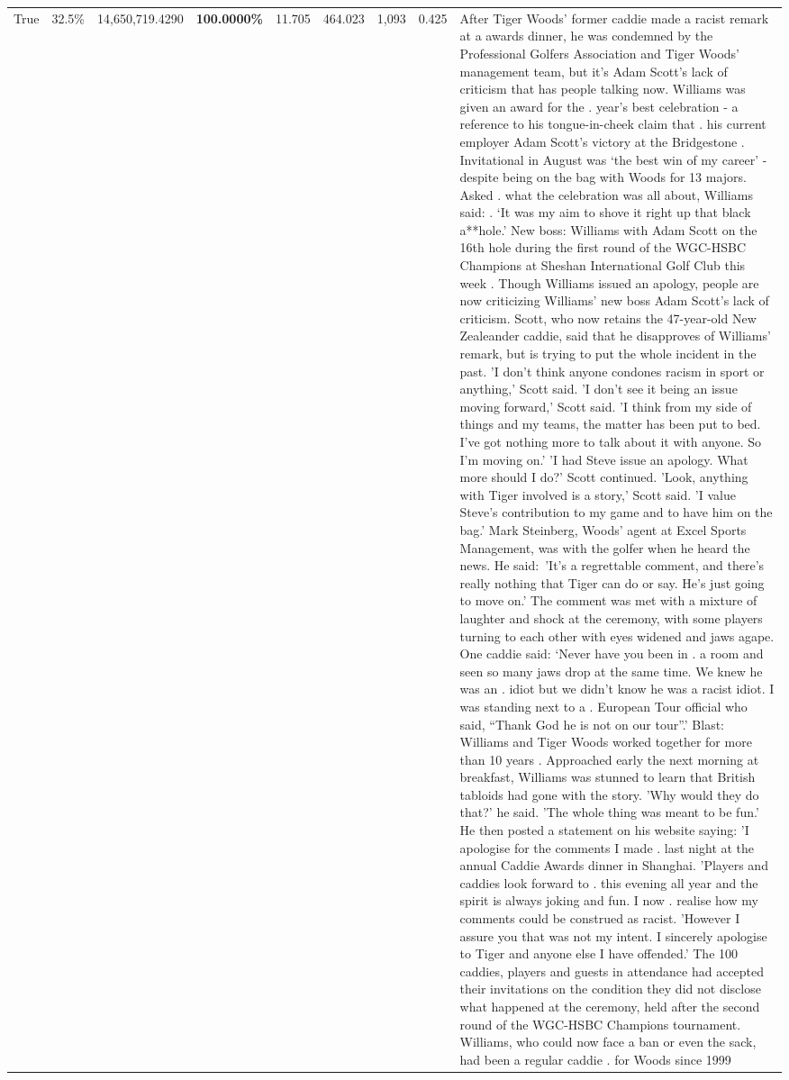 \begin{table}[H]
\begin{tabular}{lllrlllll}
True & 32.5\% & 14,650,719.4290 & \bfseries \color{red} 100.0000\% & 11.705 & 464.023 & 1,093 & 0.425 & After Tiger Woods' former caddie made a racist remark at a awards dinner, he was condemned by the Professional Golfers Association and Tiger Woods' management team, but it's Adam Scott's lack of criticism that has people talking now. Williams was given an award for the . year’s best celebration - a reference to his tongue-in-cheek claim that . his current employer Adam Scott’s victory at the Bridgestone . Invitational in August was ‘the best win of my career’ - despite being on the bag with Woods for 13 majors. Asked . what the celebration was all about, Williams said: . ‘It was my aim to shove it right up that black a**hole.’ New boss: Williams with Adam Scott  on the 16th hole during the first round of the WGC-HSBC Champions at Sheshan International Golf Club this week . Though Williams issued an apology, people are now criticizing Williams' new boss Adam Scott's lack of criticism. Scott, who now retains the 47-year-old New Zealeander caddie, said that he disapproves of Williams' remark, but is trying to put the whole incident in the past. 'I don't think anyone condones racism in sport or anything,' Scott said. 'I don't see it being an issue moving forward,' Scott said. 'I think from my side of things and my teams, the matter has been put to bed. I've got nothing more to talk about it with anyone. So I'm moving on.' 'I had Steve issue an apology. What more should I do?' Scott continued. 'Look, anything with Tiger involved is a story,' Scott said. 'I value Steve's contribution to my game and to have him on the bag.' Mark Steinberg, Woods' agent at Excel Sports Management, was with the golfer when he heard the news. He said: 'It's a regrettable comment, and there's really nothing that Tiger can do or say. He's just going to move on.' The comment was met with a mixture of laughter and shock at the ceremony, with some players turning to each other with eyes widened and jaws agape. One caddie said: ‘Never have you been in . a room and seen so many jaws drop at the same time. We knew he was an . idiot but we didn’t know he was a racist idiot. I was standing next to a . European Tour official who said, “Thank God he is not on our tour”.’ Blast: Williams and Tiger Woods worked together for more than 10 years . Approached early the next morning at breakfast, Williams was stunned to learn that British tabloids had gone with the story. 'Why would they do that?' he said. 'The whole thing was meant to be fun.' He then posted a statement on his website saying: 'I apologise for the comments I made . last night at the annual Caddie Awards dinner in Shanghai. 'Players and caddies look forward to . this evening all year and the spirit is always joking and fun. I now . realise how my comments could be construed as racist. 'However I assure you that was not my intent. I sincerely apologise to Tiger and anyone else I have offended.' The 100 caddies, players and guests in attendance had accepted their invitations on the condition they did not disclose what happened at the ceremony, held after the second round of the WGC-HSBC Champions tournament. Williams, who could now face a ban or even the sack, had been a regular caddie . for Woods since 1999 
\end{tabular}
\end{table}
